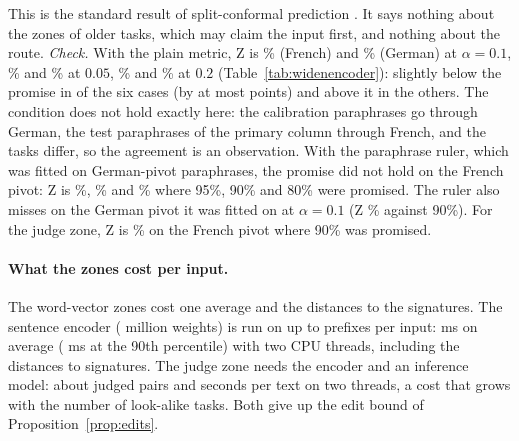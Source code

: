 This is the standard result of split-conformal prediction \citep{vovk2005algorithmic,angelopoulos2023conformal}. It
says nothing about the zones of older tasks, which may claim the input first, and nothing about
the route. \emph{Check.} With the plain metric, \textsf{Z} is \WidenEncPlainTenFrZ{}\% (French) and \WidenEncPlainTenDeZ{}\% (German)
at $\alpha = 0.1$, \WidenEncPlainFiveFrZ{}\% and \WidenEncPlainFiveDeZ{}\% at $0.05$, \WidenEncPlainTwentyFrZ{}\% and
\WidenEncPlainTwentyDeZ{}\% at $0.2$ (Table~\ref{tab:widenencoder}): slightly below the promise in \WidenPlainZBelowCount{} of the six cases (by at most \WidenPlainZBelowMax{} points) and above it in the others. The
condition does not hold exactly here: the calibration paraphrases go through German, the test paraphrases of the primary
column through French, and the tasks differ, so the agreement is an observation. With the paraphrase ruler, which was fitted on
German-pivot paraphrases, the promise did not hold on the French pivot: \textsf{Z} is \WidenEncRulerFiveFrZ{}\%, \WidenEncRulerTenFrZ{}\% and
\WidenEncRulerTwentyFrZ{}\% where 95\%, 90\% and 80\% were promised. The ruler also misses on the German pivot it was fitted on at $\alpha = 0.1$ (\textsf{Z} \WidenRulerDeTenZ{}\% against 90\%). For the judge zone, \textsf{Z} is \WidenJudgeFrZ{}\% on the French pivot
where 90\% was promised.

\paragraph{What the zones cost per input.} The word-vector zones cost one average and the distances
to the signatures. The sentence encoder (\WidenEncParams{} million weights) is run on up to \WidenEncPrefixes{} prefixes per
input: \WidenEncMs{} ms on average (\WidenEncMsHigh{} ms at the 90th percentile) with two CPU threads, including the distances to \WidenTasksEval{}
signatures. The judge zone needs the encoder and an inference model: about \WidenJudgePairs{} judged pairs and \WidenJudgeSeconds{} seconds per text on two
threads, a cost that grows with the number of look-alike tasks. Both give up the edit bound of
Proposition~\ref{prop:edits}.


